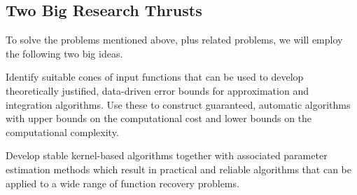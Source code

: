 \documentclass[11pt]{NSFamsart}
\begin{document}
\subsection*{Two Big Research Thrusts} To solve the problems mentioned above, plus related problems, we will employ the following two big ideas.
\begin{description}[leftmargin=2.5ex]

\item[Cones (Sect.\ \ref{SectCones})] Identify suitable cones of input functions that can be used to develop theoretically justified, data-driven error bounds for approximation and integration algorithms.  Use these to construct guaranteed, automatic algorithms with upper bounds on the computational cost and lower bounds on the computational complexity.

\item [Hilbert-Schmidt SVD (Sect.\ \ref{SectHSSVD})] Develop stable kernel-based algorithms together with associated parameter estimation methods which result in practical and reliable algorithms that can be applied to a wide range of function recovery problems.

\end{description}



\newpage
\clearpage
{}



\renewcommand{\refname}{\hfill \textbf{\large References Cited} \hfill \hfill}                   %
\renewcommand{\bibliofont}{\normalsize}


\end{document}
